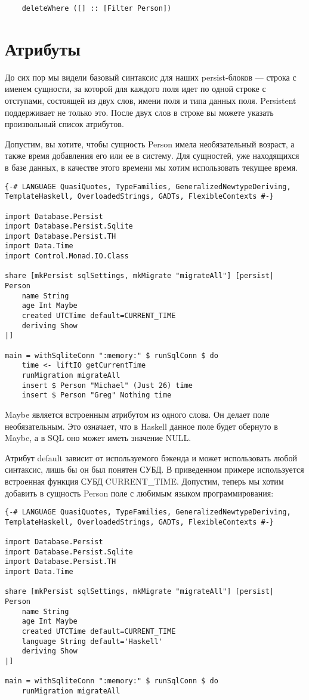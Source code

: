 \begin{lstlisting}
    deleteWhere ([] :: [Filter Person])
\end{lstlisting}

\section{Атрибуты} %

До сих пор мы видели базовый синтаксис для наших persist-блоков --- строка с именем сущности, за которой для каждого поля идет по одной строке с отступами, состоящей из двух слов, имени поля и типа данных поля. Persistent поддерживает не только это. После двух слов в строке вы можете указать произвольный список атрибутов.

Допустим, вы хотите, чтобы сущность Person имела необязательный возраст, а также время добавления его или ее в систему. Для сущностей, уже находящихся в базе данных, в качестве этого времени мы хотим использовать текущее время.

\begin{lstlisting}
{-# LANGUAGE QuasiQuotes, TypeFamilies, GeneralizedNewtypeDeriving, TemplateHaskell, OverloadedStrings, GADTs, FlexibleContexts #-}

import Database.Persist
import Database.Persist.Sqlite
import Database.Persist.TH
import Data.Time
import Control.Monad.IO.Class

share [mkPersist sqlSettings, mkMigrate "migrateAll"] [persist|
Person
    name String
    age Int Maybe
    created UTCTime default=CURRENT_TIME
    deriving Show
|]

main = withSqliteConn ":memory:" $ runSqlConn $ do
    time <- liftIO getCurrentTime
    runMigration migrateAll
    insert $ Person "Michael" (Just 26) time
    insert $ Person "Greg" Nothing time
\end{lstlisting}%

Maybe является встроенным атрибутом из одного слова. Он делает поле необязательным. Это означает, что в Haskell данное поле будет обернуто в Maybe, а в SQL оно может иметь значение NULL.

Атрибут default зависит от используемого бэкенда и может использовать любой синтаксис, лишь бы он был понятен СУБД. В приведенном примере используется встроенная функция СУБД CURRENT\_TIME. Допустим, теперь мы хотим добавить в сущность Person поле с любимым языком программирования:

\begin{lstlisting}
{-# LANGUAGE QuasiQuotes, TypeFamilies, GeneralizedNewtypeDeriving, TemplateHaskell, OverloadedStrings, GADTs, FlexibleContexts #-}

import Database.Persist
import Database.Persist.Sqlite
import Database.Persist.TH
import Data.Time

share [mkPersist sqlSettings, mkMigrate "migrateAll"] [persist|
Person
    name String
    age Int Maybe
    created UTCTime default=CURRENT_TIME
    language String default='Haskell'
    deriving Show
|]

main = withSqliteConn ":memory:" $ runSqlConn $ do
    runMigration migrateAll
\end{lstlisting}%

